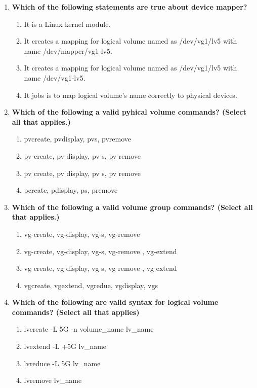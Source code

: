 \begin{flushleft}
\begin{enumerate}
		\item \textbf{Which of the following statements are true about device mapper?}
		\begin{enumerate}[label=(\alph*)]
			\item It is a Linux kernel module. %
			\item It creates a mapping for logical volume named as /dev/vg1/lv5 with name /dev/mapper/vg1-lv5. %
			\item It creates a mapping for logical volume named as /dev/vg1/lv5 with name /dev/vg1-lv5. 
			\item It jobs is to map logical volume's name correctly to physical devices. %
		\end{enumerate}
		\bigskip
		\bigskip	

		\item \textbf{Which of the following a valid pyhical volume commands? (Select all that applies.)}
		\begin{enumerate}[label=(\alph*)]
			\item pvcreate, pvdisplay, pvs, pvremove %
			\item pv-create, pv-display, pv-s, pv-remove 
			\item pv create, pv display, pv s, pv remove 
			\item pcreate, pdisplay, ps, premove 
		\end{enumerate}
		\bigskip
		\bigskip
		
		
		\item \textbf{Which of the following a valid volume group commands? (Select all that applies.)}
		\begin{enumerate}[label=(\alph*)]
			\item vg-create, vg-display, vg-s, vg-remove 
			\item vg-create, vg-display, vg-s, vg-remove , vg-extend
			\item vg create, vg display, vg s, vg remove , vg extend
			\item vgcreate, vgextend, vgredue, vgdisplay, vgs %
		\end{enumerate}
		\bigskip
		\bigskip
	

		\item \textbf{Which of the following are valid syntax for logical volume commands? (Select all that applies)}
		\begin{enumerate}[label=(\alph*)]
			\item lvcreate -L 5G -n volume\_name  lv\_name  %
			\item lvextend -L +5G  lv\_name  %
			\item lvreduce -L 5G  lv\_name  %
			\item lvremove lv\_name  %
		\end{enumerate}
		\bigskip
		\bigskip	


\end{enumerate}
\end{flushleft}
